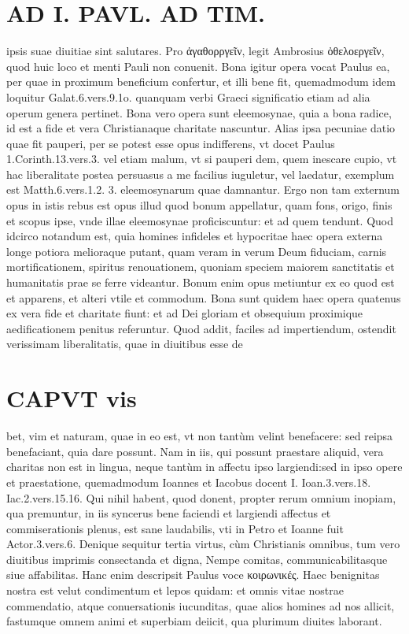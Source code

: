 \documentclass{article}
\begin{document}
\begin{pages}
\section*{AD I. PAVL. AD TIM. }
\marginpar{[ p.JUa. ]}\pstart ipsis suae diuitiae sint salutares. Pro ἀγαθορργεῖν, legit Ambrosius ὀθελοεργεῖν, quod huic loco et menti Pauli non conuenit. Bona igitur opera vocat Paulus ea, per quae in proximum beneficium confertur, et illi bene fit, quemadmodum idem loquitur Galat.6.vers.9.1o. quanquam verbi Graeci significatio etiam ad alia operum genera pertinet. Bona vero opera sunt eleemosynae, quia a bona radice, id est a fide et vera Christianaque charitate nascuntur. Alias ipsa pecuniae datio quae fit pauperi, per se potest esse opus indifferens, vt docet Paulus 1.Corinth.13.vers.3. vel etiam malum, vt si pauperi dem, quem inescare cupio, vt hac liberalitate postea persuasus a me facilius iuguletur, vel laedatur, exemplum est Matth.6.vers.1.2. 3. eleemosynarum quae damnantur. Ergo non tam externum opus in istis rebus est opus illud quod bonum appellatur, quam fons, origo, finis et scopus ipse, vnde illae eleemosynae proficiscuntur: et ad quem tendunt. Quod idcirco notandum est, quia homines infideles et hypocritae haec opera externa longe potiora melioraque putant, quam veram in verum Deum fiduciam, carnis mortificationem, spiritus renouationem, quoniam speciem maiorem sanctitatis et humanitatis prae se ferre videantur. Bonum enim opus metiuntur ex eo quod est et apparens, et alteri vtile et commodum. Bona sunt quidem haec opera quatenus ex vera fide et charitate fiunt: et ad Dei gloriam et obsequium proximique aedificationem penitus referuntur.  \pend\pstart Quod addit, faciles ad impertiendum, ostendit verissimam liberalitatis, quae in diuitibus esse de\pend
\section*{CAPVT vis }
\marginpar{[ p.2 ]}\pstart bet, vim et naturam, quae in eo est, vt non tantùm velint benefacere: sed reipsa benefaciant, quia dare possunt. Nam in iis, qui possunt praestare aliquid, vera charitas non est in lingua, neque  tantùm in affectu ipso largiendi:sed in ipso opere et praestatione, quemadmodum Ioannes et Iacobus docent I. Ioan.3.vers.18. Iac.2.vers.15.16. Qui nihil habent, quod donent, propter rerum omnium inopiam, qua premuntur, in iis syncerus bene faciendi et largiendi affectus et commiserationis plenus, est sane laudabilis, vti in Petro et Ioanne fuit Actor.3.vers.6.  \pend\pstart Denique sequitur tertia virtus, cùm Christianis omnibus, tum vero diuitibus imprimis consectanda et digna, Nempe comitas, communicabilitasque siue affabilitas. Hanc enim descripsit Paulus voce κοιρωνικές. Haec benignitas nostra est velut condimentum et lepos quidam: et omnis vitae nostrae commendatio, atque conuersationis iucunditas, quae alios homines ad nos allicit, fastumque omnem animi et superbiam deiicit, qua plurimum diuites laborant.  \pend
{}
{}

\end{pages}
\end{document}
